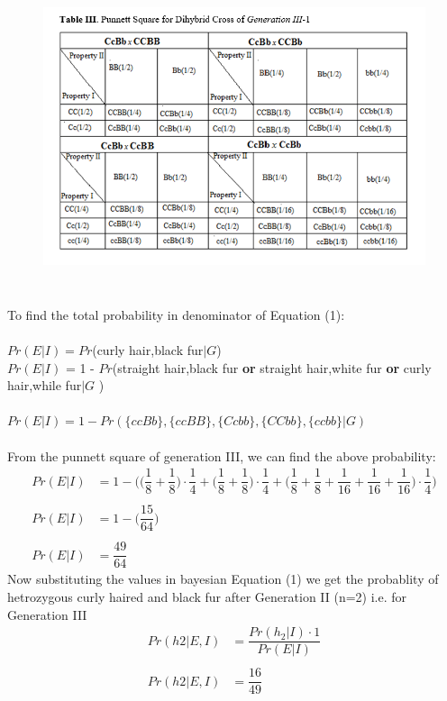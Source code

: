 \documentclass{article}
\begin{document}
\begin{itemize}
    \begin{figure}[h]
    	\centering
    	\includegraphics[height=9cm,width=12cm]{table3}
    \end{figure}
  To find the total probability in denominator of Equation (1):\\\\
  $ Pr(E|I) = Pr$(curly hair,black fur$| G$)\\
  $ Pr(E|I)$ = 1 - $ Pr $(straight hair,black fur \textbf{or} straight hair,white fur \textbf{or} curly\\ \hspace*{4cm} hair,while fur$| G$ ) \\\\
  $ Pr(E|I) = 1 - Pr(\{ccBb\},\{ccBB\},\{Ccbb\},\{CCbb\},\{ccbb\}| G)$\\\\
  From the punnett square of generation III, we can find the above probability:\\
  \begin{align*}
  Pr(E|I) &= 1 - \Big( \Big(\dfrac{1}{8} + \dfrac{1}{8}\Big)\cdot \dfrac{1}{4} + \Big(\dfrac{1}{8} + \dfrac{1}{8}\Big)\cdot\dfrac{1}{4} + \Big(\dfrac{1}{8} + \dfrac{1}{8} + \dfrac{1}{16} + \dfrac{1}{16} + \dfrac{1}{16}\Big)\cdot\dfrac{1}{4} \Big) \\\\
  Pr(E|I) &= 1 - \Big(\dfrac{15}{64}\Big)\\\\
  Pr(E|I) &= \dfrac{49}{64}       
  \end{align*}
  Now substituting the values in bayesian Equation (1) we get the probablity of hetrozygous curly haired and black fur after Generation II (n=2) i.e. for Generation III
  \begin{align*}
  Pr(h2|E,I) &= \dfrac{Pr(h_2|I)\cdot 1}{Pr(E|I)} \\\\
  Pr(h2|E,I) &= \dfrac{16}{49} 
  \end{align*}
  

\end{itemize}
\end{document}
